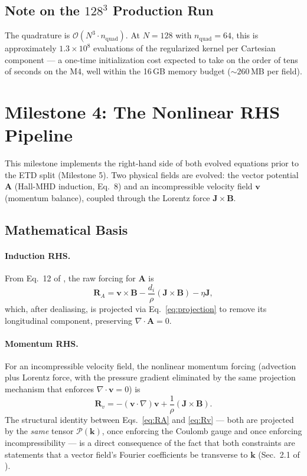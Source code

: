 \documentclass[11pt, a4paper]{article}
\renewcommand{\div}{\nabla \cdot}
\begin{document}
\subsection{Note on the $128^3$ Production Run}

The quadrature is $\mathcal{O}(N^3 \cdot n_{\mathrm{quad}})$. At $N=128$
with $n_{\mathrm{quad}}=64$, this is approximately $1.3\times 10^8$
evaluations of the regularized kernel per Cartesian component --- a
one-time initialization cost expected to take on the order of tens of
seconds on the M4, well within the 16\,GB memory budget
($\sim 260$\,MB per field).

\section{Milestone 4: The Nonlinear RHS Pipeline}
\label{sec:milestone4}

This milestone implements the right-hand side of both evolved equations
prior to the ETD split (Milestone 5). Two physical fields are evolved:
the vector potential $\mathbf{A}$ (Hall-MHD induction, Eq.~8) and an
incompressible velocity field $\mathbf{v}$ (momentum balance), coupled
through the Lorentz force $\mathbf{J}\times\mathbf{B}$.

\subsection{Mathematical Basis}

\paragraph{Induction RHS.} From Eq.~12 of \citealp{foundation2026}, the
raw forcing for $\mathbf{A}$ is
\begin{equation}
    \mathbf{R}_A = \mathbf{v}\times\mathbf{B}
    - \frac{d_i}{\rho}(\mathbf{J}\times\mathbf{B}) - \eta\mathbf{J},
    \label{eq:RA}
\end{equation}
which, after dealiasing, is projected via Eq.~\eqref{eq:projection} to
remove its longitudinal component, preserving $\div\mathbf{A}=0$.

\paragraph{Momentum RHS.} For an incompressible velocity field, the
nonlinear momentum forcing (advection plus Lorentz force, with the
pressure gradient eliminated by the same projection mechanism that
enforces $\div\mathbf{v}=0$) is
\begin{equation}
    \mathbf{R}_v = -(\mathbf{v}\cdot\nabla)\mathbf{v}
    + \frac{1}{\rho}(\mathbf{J}\times\mathbf{B}).
    \label{eq:Rv}
\end{equation}
The structural identity between Eqs.~\eqref{eq:RA} and \eqref{eq:Rv} ---
both are projected by the \emph{same} tensor $\mathcal{P}(\mathbf{k})$,
once enforcing the Coulomb gauge and once enforcing incompressibility ---
is a direct consequence of the fact that both constraints are statements
that a vector field's Fourier coefficients be transverse to $\mathbf{k}$
(Sec.~2.1 of \citealp{foundation2026}).
\end{document}
